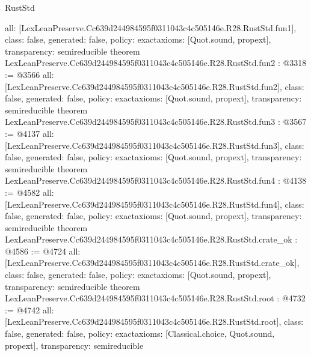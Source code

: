 \begin{lexlean}{RustStd}
\begin{coremodule}
{  all: [LexLeanPreserve.Cc639d244984595f0311043c4c505146e.R28.RustStd.fun1],
  class: false,
  generated: false,
  policy: exact{axioms: [Quot.sound, propext]},
  transparency: semireducible
}
theorem LexLeanPreserve.Cc639d244984595f0311043c4c505146e.R28.RustStd.fun2 : @3318 := @3566 {
  all: [LexLeanPreserve.Cc639d244984595f0311043c4c505146e.R28.RustStd.fun2],
  class: false,
  generated: false,
  policy: exact{axioms: [Quot.sound, propext]},
  transparency: semireducible
}
theorem LexLeanPreserve.Cc639d244984595f0311043c4c505146e.R28.RustStd.fun3 : @3567 := @4137 {
  all: [LexLeanPreserve.Cc639d244984595f0311043c4c505146e.R28.RustStd.fun3],
  class: false,
  generated: false,
  policy: exact{axioms: [Quot.sound, propext]},
  transparency: semireducible
}
theorem LexLeanPreserve.Cc639d244984595f0311043c4c505146e.R28.RustStd.fun4 : @4138 := @4582 {
  all: [LexLeanPreserve.Cc639d244984595f0311043c4c505146e.R28.RustStd.fun4],
  class: false,
  generated: false,
  policy: exact{axioms: [Quot.sound, propext]},
  transparency: semireducible
}
theorem LexLeanPreserve.Cc639d244984595f0311043c4c505146e.R28.RustStd.crate_ok : @4586 := @4724 {
  all: [LexLeanPreserve.Cc639d244984595f0311043c4c505146e.R28.RustStd.crate_ok],
  class: false,
  generated: false,
  policy: exact{axioms: [Quot.sound, propext]},
  transparency: semireducible
}
theorem LexLeanPreserve.Cc639d244984595f0311043c4c505146e.R28.RustStd.root : @4732 := @4742 {
  all: [LexLeanPreserve.Cc639d244984595f0311043c4c505146e.R28.RustStd.root],
  class: false,
  generated: false,
  policy: exact{axioms: [Classical.choice, Quot.sound, propext]},
  transparency: semireducible
}


\end{coremodule}
\end{lexlean}
